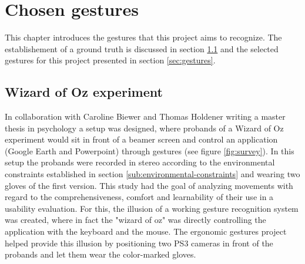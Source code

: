 \chapter{Chosen gestures}
\label{chap:chosen-gestures}

This chapter introduces the gestures that this project aims to recognize. The establishement of a ground truth is discussed in section \ref{sec:wizard-of-oz-experiment} and the selected gestures for this project presented in section \ref{sec:gestures}.

\section{Wizard of Oz experiment}
\label{sec:wizard-of-oz-experiment}

In collaboration with Caroline Biewer and Thomas Holdener writing a master thesis in psychology \cite{psychology} a setup was designed, where probands of a Wizard of Oz experiment would sit in front of a beamer screen and control an application (Google Earth and Powerpoint) through gestures (see figure \ref{fig:survey}). In this setup the probands were recorded in stereo according to the environmental constraints established in section \ref{sub:environmental-constraints} and wearing two gloves of the first version. This study had the goal of analyzing movements with regard to the comprehensiveness, comfort and learnability of their use in a usability evaluation. For this, the illusion of a working gesture recognition system was created, where in fact the "wizard of oz" was directly controlling the application with the keyboard and the mouse. The ergonomic gestures project helped provide this illusion by positioning two PS3 cameras in front of the probands and let them wear the color-marked gloves.

